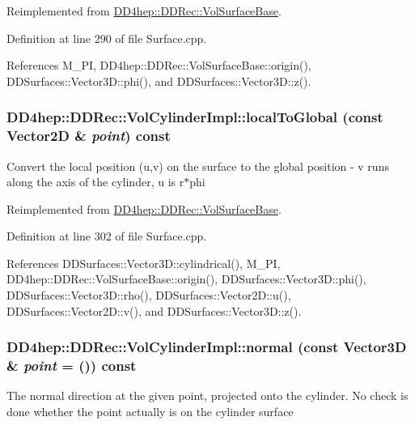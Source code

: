 Reimplemented from \hyperlink{class_d_d4hep_1_1_d_d_rec_1_1_vol_surface_base_aa5a6ee5edfdab58a13282beaef1331d4}{DD4hep::DDRec::VolSurfaceBase}.

Definition at line 290 of file Surface.cpp.

References M\_\-PI, DD4hep::DDRec::VolSurfaceBase::origin(), DDSurfaces::Vector3D::phi(), and DDSurfaces::Vector3D::z().\hypertarget{class_d_d4hep_1_1_d_d_rec_1_1_vol_cylinder_impl_ae0918a43a874b96dc2f55506d4f509a2}{
\subsubsection[{localToGlobal}]{ DD4hep::DDRec::VolCylinderImpl::localToGlobal (const {\bf Vector2D} \& {\em point}) const}}
\label{class_d_d4hep_1_1_d_d_rec_1_1_vol_cylinder_impl_ae0918a43a874b96dc2f55506d4f509a2}
Convert the local position (u,v) on the surface to the global position -\/ v runs along the axis of the cylinder, u is r$\ast$phi 

Reimplemented from \hyperlink{class_d_d4hep_1_1_d_d_rec_1_1_vol_surface_base_a62f5625f6f620535765193e97990fb1d}{DD4hep::DDRec::VolSurfaceBase}.

Definition at line 302 of file Surface.cpp.

References DDSurfaces::Vector3D::cylindrical(), M\_\-PI, DD4hep::DDRec::VolSurfaceBase::origin(), DDSurfaces::Vector3D::phi(), DDSurfaces::Vector3D::rho(), DDSurfaces::Vector2D::u(), DDSurfaces::Vector2D::v(), and DDSurfaces::Vector3D::z().\hypertarget{class_d_d4hep_1_1_d_d_rec_1_1_vol_cylinder_impl_a1863142729883b2e20c78dadabd04927}{
\subsubsection[{normal}]{ DD4hep::DDRec::VolCylinderImpl::normal (const {\bf Vector3D} \& {\em point} = {()}) const}}
\label{class_d_d4hep_1_1_d_d_rec_1_1_vol_cylinder_impl_a1863142729883b2e20c78dadabd04927}
The normal direction at the given point, projected onto the cylinder. No check is done whether the point actually is on the cylinder surface 

